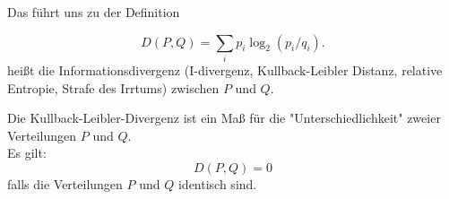 Das führt uns zu der Definition
\begin{definition}
\[D(P,Q)=\sum_ip_i\log_2(p_i/q_i).\]
heißt die Informationsdivergenz (I-divergenz, Kullback-Leibler Distanz,
relative Entropie, Strafe des Irrtums) zwischen $P$ und $Q$.
\end{definition}
Die Kullback-Leibler-Divergenz ist ein Maß für die "Unterschiedlichkeit" zweier Verteilungen $P$ und $Q$.\\
Es gilt:
\[D(P,Q) = 0\]
falls die Verteilungen $P$ und $Q$ identisch sind.



\ifdefined\uebsps


\fi


